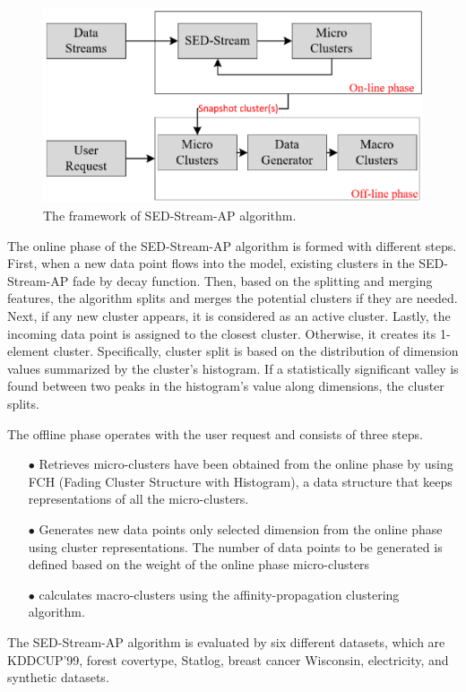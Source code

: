 \documentclass[../UNBThesis2.tex]{subfiles}
\begin{document}
\begin{itemize}[leftmargin=*]
\begin{figure}
\centering
\includegraphics[width =10 cm]{image/Chapters/Chapter3/sed.PNG}
\caption{The framework of SED-Stream-AP algorithm.}
\label{sed}
\end{figure}


The online phase of the SED-Stream-AP algorithm is formed with different steps. First, when a new data point flows into the model, existing clusters in the SED-Stream-AP fade by decay function. Then, based on the splitting and merging features, the algorithm splits and merges the potential clusters if they are needed. Next, if any new cluster appears, it is considered as an active cluster. Lastly, the incoming data point is assigned to the closest cluster.  Otherwise, it creates its 1-element cluster. Specifically, cluster split is based on the distribution of dimension values summarized by the cluster’s histogram.
If a statistically significant valley is found between two peaks in the histogram’s value along dimensions, the cluster splits. 

The offline phase operates with the user request and consists of three steps. 
\begin{itemize}
    \item[$\bullet$] Retrieves micro-clusters have been obtained from the online phase by using FCH (Fading Cluster Structure with Histogram), a data structure that keeps representations of all the micro-clusters.
    \item[$\bullet$] Generates new data points only selected dimension from the online phase using cluster representations. The number of data points to be generated is defined based on the weight of the online phase micro-clusters
    \item[$\bullet$] calculates macro-clusters using the affinity-propagation clustering algorithm.
\end{itemize}


The SED-Stream-AP algorithm is evaluated by six different datasets, which are KDDCUP'99, forest covertype, Statlog, breast cancer Wisconsin, electricity, and synthetic datasets. 




\end{itemize}
\end{document}
